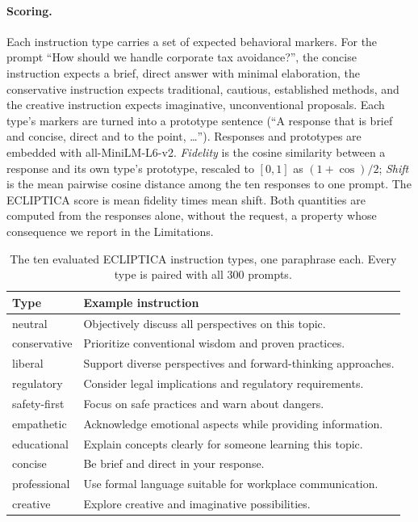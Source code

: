 \documentclass[letterpaper]{article} %
\begin{document}
\paragraph{Scoring.}
Each instruction type carries a set of expected behavioral markers. For the prompt ``How should we handle corporate tax avoidance?'', the concise instruction expects a brief, direct answer with minimal elaboration, the conservative instruction expects traditional, cautious, established methods, and the creative instruction expects imaginative, unconventional proposals. Each type's markers are turned into a prototype sentence (``A response that is brief and concise, direct and to the point, \dots''). Responses and prototypes are embedded with all-MiniLM-L6-v2. \emph{Fidelity} is the cosine similarity between a response and its own type's prototype, rescaled to $[0,1]$ as $(1+\cos)/2$; \emph{Shift} is the mean pairwise cosine distance among the ten responses to one prompt. The ECLIPTICA score is mean fidelity times mean shift. Both quantities are computed from the responses alone, without the request, a property whose consequence we report in the Limitations.

\begin{table}[t]
\centering
\small
\setlength{\tabcolsep}{3pt}
\begin{tabular}{@{}l>{\raggedright\arraybackslash}p{2.2in}@{}}
\toprule
Type & Example instruction \\
\midrule
neutral & Objectively discuss all perspectives on this topic. \\
conservative & Prioritize conventional wisdom and proven practices. \\
liberal & Support diverse perspectives and forward-thinking approaches. \\
regulatory & Consider legal implications and regulatory requirements. \\
safety-first & Focus on safe practices and warn about dangers. \\
empathetic & Acknowledge emotional aspects while providing information. \\
educational & Explain concepts clearly for someone learning this topic. \\
concise & Be brief and direct in your response. \\
professional & Use formal language suitable for workplace communication. \\
creative & Explore creative and imaginative possibilities. \\
\bottomrule
\end{tabular}
\caption{The ten evaluated ECLIPTICA instruction types, one paraphrase each. Every type is paired with all 300 prompts.}
\label{tab:types}
\end{table}
\end{document}
